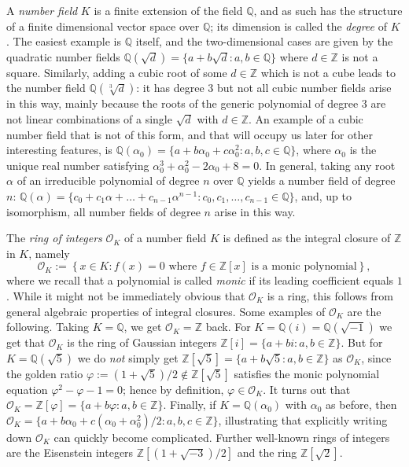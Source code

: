 \documentclass[sn-mathphys]{sn-jnl}%
\newcommand*{\OK}[1][K]{\mathcal{O}_{#1}}
\newcommand{\QQ}{\mathbb{Q}}
\renewcommand{\Z}{\mathbb{Z}}
\begin{document}
A \emph{number field} $K$ is a finite extension of the field $\QQ$, and as such has the structure of a finite dimensional vector space over $\QQ$; its dimension is called the \emph{degree} of $K$.
The easiest example is $\QQ$ itself, and the two-dimensional cases are given by the quadratic number fields
$\QQ(\sqrt{d})=\{a+b\sqrt{d} : a,b \in \QQ\}$
where $d \in \Z$ is not a square. Similarly, adding a cubic root of some $d\in\Z$ which is not a cube leads to the number field $\QQ(\sqrt[3]{d})$: it has degree $3$ but not all cubic number fields arise in this way, mainly because the roots of the generic polynomial of degree $3$ are not linear combinations of a single $\sqrt{d}$ with $d\in\Z$. An example of a cubic number field that is not of this form, and that will occupy us later for other interesting features, is $\QQ(\alpha_0)=\{a+b\alpha_0+c \alpha_0^2: a,b,c \in \QQ\}$, where $\alpha_0$ is the unique real number satisfying $\alpha_0^3 + \alpha_0^2 - 2\alpha_0 + 8=0$.
In general, taking any root $\alpha$ of an irreducible polynomial of degree $n$ over $\QQ$ yields a number field of degree $n$:
$\QQ(\alpha)=\{c_0+c_1\alpha+\ldots+c_{n-1} \alpha^{n-1} : c_0,c_1,\ldots,c_{n-1} \in \QQ \}$,
and, up to isomorphism, all number fields of degree $n$ arise in this way.

The \emph{ring of integers} $\OK$ of a number field $K$ is defined as the integral closure of $\Z$ in $K$, namely
\[
  \OK := \left\{x \in K : f(x)=0 \text{ where $f \in \Z[x]$ is a monic polynomial}\right\},\]
where we recall that a polynomial is called \emph{monic} if its leading coefficient equals $1$.
While it might not be immediately obvious that $\OK$ is a ring, this follows from general algebraic properties of integral closures.
Some examples of $\OK$ are the following. Taking $K=\QQ$, we get $\OK=\Z$ back.
For $K=\QQ(i)=\QQ(\sqrt{-1})$ we get that $\OK$ is the ring of Gaussian integers $\Z[i]=\{a+bi : a,b \in \Z\}$.
But for $K=\QQ(\sqrt{5})$ we do \emph{not} simply get $\Z[\sqrt{5}]=\{a+b\sqrt{5} : a,b \in \Z\}$ as $\OK$, since the golden ratio $\varphi:=(1+\sqrt{5})/2\not\in \Z[\sqrt{5}]$ satisfies the monic polynomial equation $\varphi^2-\varphi-1=0$; hence by definition, $\varphi \in \OK$.
It turns out that $\OK=\Z[\varphi]=\{a+b\varphi : a,b \in \Z\}$.
Finally, if $K=\QQ(\alpha_0)$ with $\alpha_0$ as before, then $\OK=\{a+b \alpha_0+c (\alpha_0+\alpha_0^2)/2 : a,b,c \in \Z\}$, illustrating that explicitly writing down $\OK$ can quickly become complicated.
Further well-known rings of integers are
the Eisenstein integers $\Z[(1+\sqrt{-3})/2]$ and the ring $\Z[\sqrt{2}]$.
\end{document}
